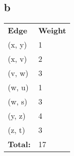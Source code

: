 \documentclass[11pt]{article}
\begin{document}
\subsection*{b}
\begin{table}[h]
    \centering
    \begin{tabular}{ll}
    \textbf{Edge}   & \textbf{Weight} \\
    (x, y) & 1      \\
    (x, v) & 2      \\
    (v, w) & 3      \\
    (w, u) & 1      \\
    (w, s) & 3      \\
    (y, z) & 4      \\
    (z, t) & 3      \\
    \textbf{Total:} & 17
    \end{tabular}
\end{table}
\end{document}
